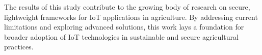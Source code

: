 \documentclass[journal]{Definitions/mdpi}
\begin{document}
The results of this study contribute to the growing body of research on secure, lightweight frameworks for IoT applications in agriculture. By addressing current limitations and exploring advanced solutions, this work lays a foundation for broader adoption of IoT technologies in sustainable and secure agricultural practices.


\vspace{6pt} 



\end{document}
